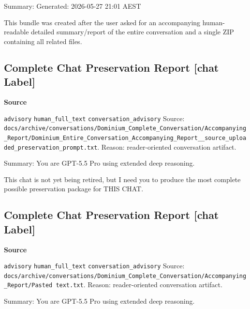 \documentclass[9pt,a4paper,openany]{book}
\newcommand{\vonecallout}[3]{\par\medskip\noindent\begingroup\setlength{\fboxsep}{7pt}\colorbox{DomCalloutBg}{\parbox{0.94\linewidth}{\textbf{\textcolor{#1}{#2}}\par #3}}\endgroup\par\medskip}
\begin{document}
Summary: Generated: 2026-\allowbreak{}05-\allowbreak{}27 21:01 AEST


This bundle was created after the user asked for an accompanying human-\allowbreak{}readable detailed summary/\allowbreak{}report of the entire conversation and a single ZIP containing all related files.\allowbreak{}



\subsection{Complete Chat Preservation Report [chat Label]}

\vonecallout{DomSlate}{Source}{\texttt{advisory} \texttt{human\_\allowbreak{}full\_\allowbreak{}text} \texttt{conversation\_\allowbreak{}advisory} Source: \texttt{docs/\allowbreak{}archive/\allowbreak{}conversations/\allowbreak{}Dominium\_\allowbreak{}Complete\_\allowbreak{}Conversation/\allowbreak{}Accompanying\_\allowbreak{}Report/\allowbreak{}Dominium\_\allowbreak{}Entire\_\allowbreak{}Conversation\_\allowbreak{}Accompanying\_\allowbreak{}Report\_\allowbreak{}\_\allowbreak{}source\_\allowbreak{}uploaded\_\allowbreak{}preservation\_\allowbreak{}prompt.\allowbreak{}txt}.\allowbreak{} Reason: reader-\allowbreak{}oriented conversation artifact.\allowbreak{}}

Summary: You are GPT-\allowbreak{}5.\allowbreak{}5 Pro using extended deep reasoning.\allowbreak{}


This chat is not yet being retired, but I need you to produce the most complete possible preservation package for THIS CHAT.\allowbreak{}



\subsection{Complete Chat Preservation Report [chat Label]}

\vonecallout{DomSlate}{Source}{\texttt{advisory} \texttt{human\_\allowbreak{}full\_\allowbreak{}text} \texttt{conversation\_\allowbreak{}advisory} Source: \texttt{docs/\allowbreak{}archive/\allowbreak{}conversations/\allowbreak{}Dominium\_\allowbreak{}Complete\_\allowbreak{}Conversation/\allowbreak{}Accompanying\_\allowbreak{}Report/\allowbreak{}Pasted text.\allowbreak{}txt}.\allowbreak{} Reason: reader-\allowbreak{}oriented conversation artifact.\allowbreak{}}

Summary: You are GPT-\allowbreak{}5.\allowbreak{}5 Pro using extended deep reasoning.\allowbreak{}
\end{document}
